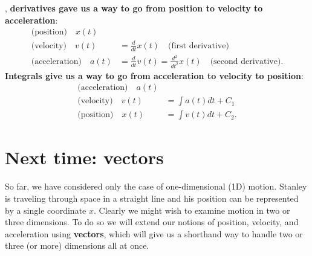 \documentclass{tufte-handout}
\begin{document}
, \textbf{derivatives gave us a way to go from position to velocity to acceleration}:
\begin{align}
\text{(position)}\quad x(t) & \\
\text{(velocity)}\quad v(t) &= \frac{d}{dt} x(t)\quad\text{(first derivative)} \\
\text{(acceleration)}\quad a(t) &= \frac{d}{dt} v(t) = \frac{d^2}{dt^2} x(t)\quad\text{(second derivative)}.
\end{align}
\textbf{Integrals give us a way to go from acceleration to velocity to position}:
\begin{align}
\text{(acceleration)}\quad a(t) & \\
\text{(velocity)}\quad v(t) &= \int a(t) dt + C_1 \\
\text{(position)}\quad x(t) &= \int v(t) dt + C_2.
\end{align}




\section{Next time: vectors}
So far, we have considered only the case of one-dimensional (1D) motion. Stanley is traveling through space in a straight line and his position can be represented by a single coordinate $x$. Clearly we might wish to examine motion in two or three dimensions. To do so we will extend our notions of position, velocity, and acceleration using \textbf{vectors}, which will give us a shorthand way to handle two or three (or more) dimensions all at once. 


\end{document}

